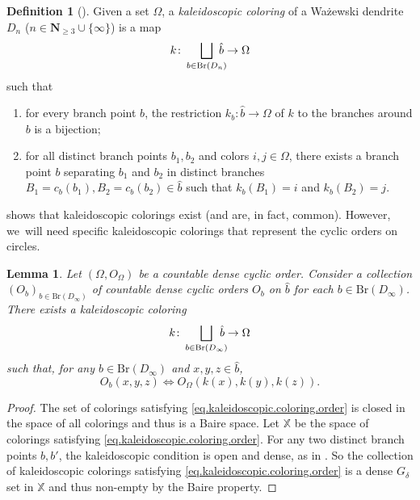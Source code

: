 \documentclass[JEP,XML,SOM,Unicode,NoFloatCountersInSection,published]{cedram}
\theoremstyle{plain}
\newtheorem{lemma}[theorem]{Lemma}
\theoremstyle{definition}
\newtheorem{definition}[theorem]{Definition}
\theoremstyle{remark}
\newcommand{\Br}{\mathrm{Br}}
\begin{document}
\begin{definition}[{\cite[Defs.\,3.1 \& 3.2]{Kaleidoscopic}}]
\label{def.kaleidoscopic.coloring}
Given a set $\Omega$, a \emph{kaleidoscopic coloring} of a Ważewski dendrite $D_n$ ($n \in \mathbf{N}_{\geq 3} \cup \{\infty\}$) is a map
\[
 k \colon \bigsqcup_{b\in\Br(D_n)}\hspace*{-3mm} \hat{b} \to \Omega 
\]
such that
\begin{enumerate}
\item for every branch point $b$, the restriction $k_b \colon \hat{b} \to \Omega$ of $k$ to the branches around $b$ is a bijection;
\item for all distinct branch points $b_1, b_2$ and colors $i,j \in \Omega$, there exists a branch point $b$ separating $b_1$ and $b_2$ in distinct branches $B_1 = c_b(b_1), B_2 = c_b(b_2) \in \hat{b}$ such that $k_b(B_1) = i$ and $k_b(B_2) = j$.
\end{enumerate}
\end{definition}

\cite[Prop.\,3.3]{Kaleidoscopic} shows that kaleidoscopic colorings exist (and are, in fact, common).
However, we~will need specific kaleidoscopic colorings that represent the cyclic orders on circles.

\begin{lemma}
\label{lem.kaleidoscopic.coloring.order}
Let $(\Omega,O_\Omega)$ be a countable dense cyclic order.
Consider a collection $(O_b)_{b\in \Br(D_\infty)}$ of countable dense cyclic orders $O_b$ on $\hat{b}$ for each $b\in\Br(D_\infty)$.
There exists a kaleidoscopic coloring
\[
 k\colon \bigsqcup_{b\in\Br(D_\infty)}\hspace*{-3mm} \hat{b} \to \Omega 
\]
such that, for any $b\in \Br(D_\infty)$ and $x,y,z\in \hat{b}$,
\begin{equation}
\label{eq.kaleidoscopic.coloring.order}
O_b(x,y,z)\iff O_\Omega(k(x),k(y),k(z)).
\end{equation}
\end{lemma}

\begin{proof}
The set of colorings satisfying \cref{eq.kaleidoscopic.coloring.order} is closed in the space of all colorings and thus is a Baire space.
Let $\mathbb{X}$ be the space of colorings satisfying \cref{eq.kaleidoscopic.coloring.order}.
For any two distinct branch points $b,b'$, the kaleidoscopic condition is open and dense, as in \cite[Prop.\,3.3]{Kaleidoscopic}.
So the collection of kaleidoscopic colorings satisfying \cref{eq.kaleidoscopic.coloring.order} is a dense $G_\delta$ set in $\mathbb{X}$ and thus non-empty by the Baire property.
\end{proof}
\end{document}
